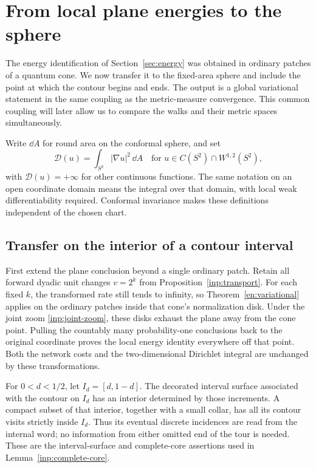 \section{From local plane energies to the sphere}\label{sec:sphere}

The energy identification of Section~\ref{sec:energy} was obtained in
ordinary patches of a quantum cone.  We now transfer it to the fixed-area
sphere and include the point at which the contour begins and ends.  The
output is a global variational statement in the same coupling as the
metric-measure convergence.  This common coupling will later allow us to
compare the walks and their metric spaces simultaneously.

Write $\dd A$ for round area on the conformal sphere, and set
\[
 \mathcal D(u)=\int_{S^2}|\nabla u|^2\,\dd A
 \quad\text{for }u\in C(S^2)\cap W^{1,2}(S^2),
\]
with $\mathcal D(u)=+\infty$ for other continuous functions.  The same
notation on an open coordinate domain means the integral over that
domain, with local weak differentiability required.  Conformal
invariance makes these definitions independent of the chosen chart.

\subsection{Transfer on the interior of a contour interval}

First extend the plane conclusion beyond a single ordinary patch.
Retain all forward dyadic unit changes $v=2^k$ from
Proposition~\ref{inp:transport}.  For each fixed $k$, the transformed
rate still tends to infinity, so Theorem~\ref{en:variational} applies
on the ordinary patches inside that cone's normalization disk.
Under the joint zoom \eqref{inp:joint-zoom}, these disks exhaust the
plane away from the cone point.  Pulling the countably many
probability-one conclusions back to the original coordinate proves
the local energy identity everywhere off that point.  Both the
network costs and the two-dimensional Dirichlet integral are unchanged
by these transformations.

For $0<d<1/2$, let $I_d=[d,1-d]$.  The decorated interval surface
associated with the contour on $I_d$ has an interior determined by those
increments.  A compact subset of that interior, together with a small
collar, has all its contour visits strictly inside $I_d$.  Thus its
eventual discrete incidences are read from the internal word; no
information from either omitted end of the tour is needed.  These are
the interval-surface and complete-core assertions used in
Lemma~\ref{inp:complete-core}.

